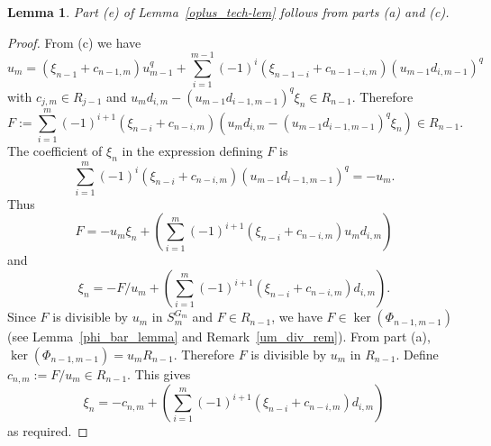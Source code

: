 \documentclass{amsart}
\newtheorem{lem}[subsection]{Lemma}
\begin{document}
\begin{lem} Part (e) of Lemma~\ref{oplus_tech-lem} follows 
from parts (a) and (c).
\end{lem}
\begin{proof} From (c) we have
$$u_m=(\xi_{n-1}+c_{n-1,m})u_{m-1}^q+\sum_{i=1}^{m-1}(-1)^i(\xi_{n-1-i}+c_{n-1-i,m})(u_{m-1}d_{i,m-1})^q$$
with $c_{j,m}\in R_{j-1}$ and $u_m d_{i,m}-(u_{m-1}d_{i-1,m-1})^q\xi_{n}\in R_{n-1}$.
Therefore
$$F:=\sum_{i=1}^{m}(-1)^{i+1}(\xi_{n-i}+c_{n-i,m})(u_md_{i,m}-(u_{m-1}d_{i-1,m-1})^q\xi_{n})\in R_{n-1}.$$
The coefficient of $\xi_{n}$ in the expression defining $F$ is
$$\sum_{i=1}^{m}(-1)^{i}(\xi_{n-i}+c_{n-i,m})(u_{m-1}d_{i-1,m-1})^q
=-u_m.$$ 
Thus  $$F=-u_m\xi_n+\left(\sum_{i=1}^{m}(-1)^{i+1}(\xi_{n-i}+c_{n-i,m})u_{m}d_{i,m}\right)$$
and $$\xi_n=-F/u_m+\left(\sum_{i=1}^{m}(-1)^{i+1}(\xi_{n-i}+c_{n-i,m})d_{i,m}\right).
$$
Since $F$ is divisible by $u_m$ in $S_m^{G_m}$ and $F\in R_{n-1}$,
we have $F\in \ker(\Phi_{n-1,m-1})$ (see Lemma~\ref{phi_bar_lemma} and 
Remark~\ref{um_div_rem}).
From part (a), $\ker(\Phi_{n-1,m-1})=u_mR_{n-1}$.
Therefore $F$ is divisible by $u_m$ in $R_{n-1}$.
Define $c_{n,m}:=F/u_m\in R_{n-1}$.
This gives
$$\xi_n=-c_{n,m}+\left(\sum_{i=1}^{m}(-1)^{i+1}(\xi_{n-i}+c_{n-i,m})d_{i,m}\right)$$
as required.
\end {proof}
\end{document}
